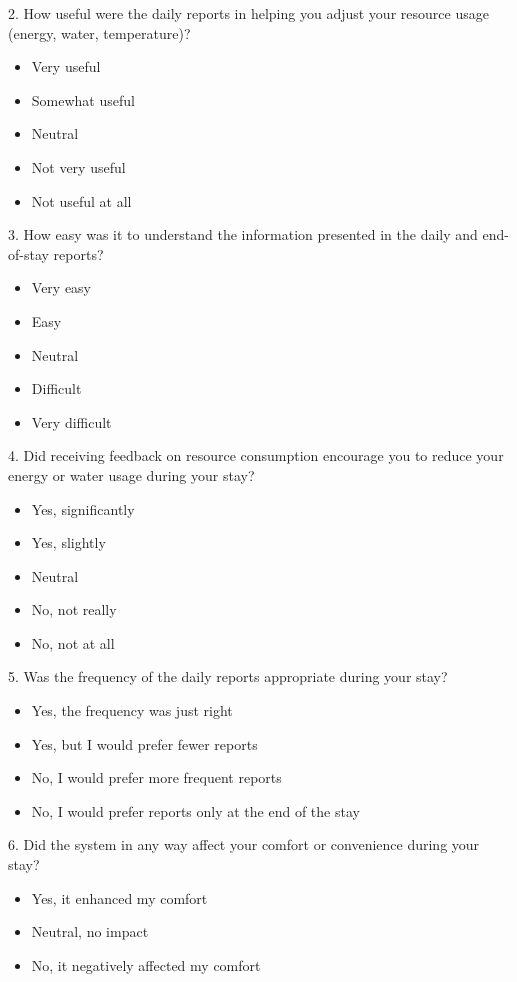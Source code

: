 2. How useful were the daily reports in helping you adjust your resource usage (energy, water, temperature)?
\begin{itemize}[label=\Square]
    \item Very useful
    \item Somewhat useful
    \item Neutral
    \item Not very useful  
    \item Not useful at all
\end{itemize}

3. How easy was it to understand the information presented in the daily and end-of-stay reports?
    \begin{itemize}[label=\Square]
        \item Very easy
        \item Easy
        \item Neutral
        \item Difficult
        \item Very difficult
    \end{itemize}

4. Did receiving feedback on resource consumption encourage you to reduce your energy or water usage during your stay?
\begin{itemize}[label=\Square]
    \item Yes, significantly
    \item Yes, slightly
    \item Neutral
    \item No, not really
    \item No, not at all
\end{itemize}

5. Was the frequency of the daily reports appropriate during your stay?
\begin{itemize}[label=\Square]
    \item Yes, the frequency was just right
    \item Yes, but I would prefer fewer reports
    \item No, I would prefer more frequent reports
    \item No, I would prefer reports only at the end of the stay
\end{itemize}

6. Did the system in any way affect your comfort or convenience during your stay?
\begin{itemize}[label=\Square]
    \item Yes, it enhanced my comfort
    \item Neutral, no impact
    \item No, it negatively affected my comfort
\end{itemize}

